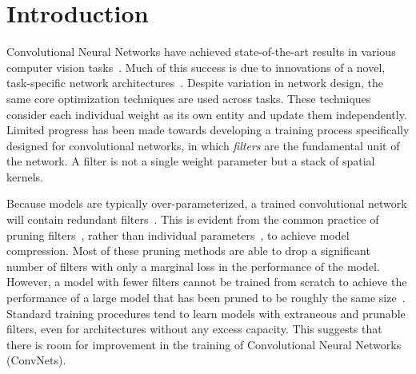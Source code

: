 \section{Introduction}

Convolutional Neural Networks have achieved state-of-the-art results in various computer vision tasks~\cite{he2015deep, Lin2018FocalLF}. 
Much of this success is due to innovations of a novel, task-specific network architectures~\cite{He2017MaskR, Ronneberger2015UNetCN}.
Despite variation in network design, the same core optimization techniques are used across tasks.
These techniques consider each individual weight as its own entity and update them independently.
Limited progress has been made towards developing a training process specifically designed for convolutional networks, in which \textit{filters} are the fundamental unit of the network.
A filter is not a single weight parameter but a stack of spatial kernels.

Because models are typically over-parameterized, a trained convolutional network will contain redundant filters~\cite{Cogswell2015ReducingOI, Li2016PruningFF}. %
This is evident from the common practice of pruning filters~\cite{He2017ChannelPF, Anwar2017StructuredPO, Li2016PruningFF, Molchanov2016PruningCN, Liu2017LearningEC, Luo2017ThiNetAF}, rather than individual parameters~\cite{Han2015DeepCC}, to achieve model compression.
Most of these pruning methods are able to drop a significant number of filters with only a marginal loss in the performance of the model.
However, a model with fewer filters cannot be trained from scratch to achieve the performance of a large model that has been pruned to be roughly the same size~\cite{Li2016PruningFF, Luo2017ThiNetAF, Zhu2017ToPO}.
Standard training procedures tend to learn models with extraneous and prunable filters, even for architectures without any excess capacity.
This suggests that there is room for improvement in the training of Convolutional Neural Networks (ConvNets).

